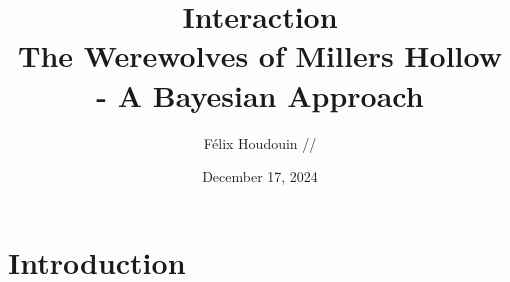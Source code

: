 \documentclass[fleqn,11pt]{article}
\title{
    \textbf{\huge Interaction} \\[0.5em]
    \large The Werewolves of Millers Hollow - A Bayesian Approach
}
\author{Félix Houdouin // }
\date{December 17, 2024}
\begin{document}
\maketitle

\section{Introduction}
\end{document}
